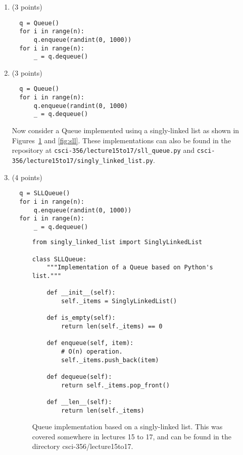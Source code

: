 \documentclass{article}
\begin{document}
\begin{enumerate}[label=(\alph*)]

\item (3 points)
\begin{verbatim}
  q = Queue()
  for i in range(n):
      q.enqueue(randint(0, 1000))
  for i in range(n):
      _ = q.dequeue()
\end{verbatim}

\item (3 points)

\begin{verbatim}
  q = Queue()
  for i in range(n):
      q.enqueue(randint(0, 1000)
      _ = q.dequeue()
\end{verbatim}   

Now consider a Queue implemented usinq a singly-linked list as shown
in Figures~\ref{fig:sll_queue} and \ref{fig:sll}.  These
implementations can also be found in the repository at
\verb|csci-356/lecture15to17/sll_queue.py| and
\verb|csci-356/lecture15to17/singly_linked_list.py|.

\item (4 points)
\begin{verbatim}
  q = SLLQueue()
  for i in range(n):
      q.enqueue(randint(0, 1000))
  for i in range(n):
      _ = q.dequeue()
\end{verbatim}

\begin{figure}
\begin{verbatim}
from singly_linked_list import SinglyLinkedList

class SLLQueue:
    """Implementation of a Queue based on Python's list."""

    def __init__(self):
        self._items = SinglyLinkedList()

    def is_empty(self):
        return len(self._items) == 0

    def enqueue(self, item):
        # O(n) operation.
        self._items.push_back(item)

    def dequeue(self):
        return self._items.pop_front()

    def __len__(self):
        return len(self._items)

\end{verbatim}

\caption{Queue implementation based on a singly-linked list.  This was
  covered somewhere in lectures 15 to 17, and can be found in the
  directory csci-356/lecture15to17.}\label{fig:sll_queue}
\end{figure}




\end{enumerate}
\end{document}
